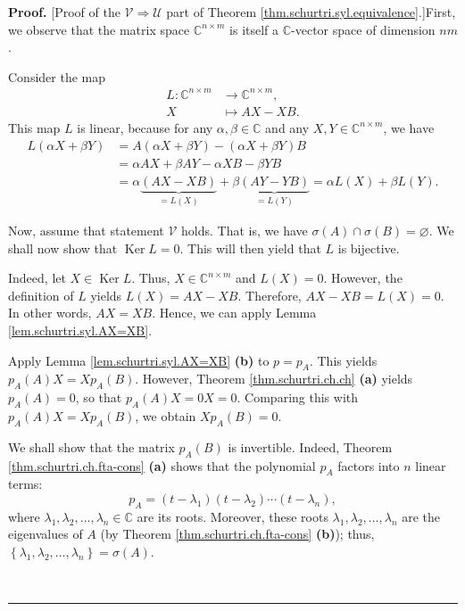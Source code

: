 \documentclass[numbers=enddot,12pt,final,onecolumn,notitlepage]{scrartcl}%
\numberwithin{exer}{subsection}
\theoremstyle{definition}
\newenvironment{proof}[1][Proof]{\noindent\textbf{#1.} }{\ \rule{0.5em}{0.5em}}
\begin{document}
\begin{proof}
[Proof of the $\mathcal{V}\Longrightarrow\mathcal{U}$ part of Theorem
\ref{thm.schurtri.syl.equivalence}.]First, we observe that the matrix space
$\mathbb{C}^{n\times m}$ is itself a $\mathbb{C}$-vector space of dimension
$nm$.

Consider the map%
\begin{align*}
L:\mathbb{C}^{n\times m} &  \rightarrow\mathbb{C}^{n\times m},\\
X &  \mapsto AX-XB.
\end{align*}
This map $L$ is linear, because for any $\alpha,\beta\in\mathbb{C}$ and any
$X,Y\in\mathbb{C}^{n\times m}$, we have%
\begin{align*}
L\left(  \alpha X+\beta Y\right)   &  =A\left(  \alpha X+\beta Y\right)
-\left(  \alpha X+\beta Y\right)  B\\
&  =\alpha AX+\beta AY-\alpha XB-\beta YB\\
&  =\alpha\underbrace{\left(  AX-XB\right)  }_{=L\left(  X\right)  }%
+\beta\underbrace{\left(  AY-YB\right)  }_{=L\left(  Y\right)  }=\alpha
L\left(  X\right)  +\beta L\left(  Y\right)  .
\end{align*}


Now, assume that statement $\mathcal{V}$ holds. That is, we have
$\sigma\left(  A\right)  \cap\sigma\left(  B\right)  =\varnothing$. We shall
now show that $\operatorname*{Ker}L=0$. This will then yield that $L$ is bijective.

Indeed, let $X\in\operatorname*{Ker}L$. Thus, $X\in\mathbb{C}^{n\times m}$ and
$L\left(  X\right)  =0$. However, the definition of $L$ yields $L\left(
X\right)  =AX-XB$. Therefore, $AX-XB=L\left(  X\right)  =0$. In other words,
$AX=XB$. Hence, we can apply Lemma \ref{lem.schurtri.syl.AX=XB}.

Apply Lemma \ref{lem.schurtri.syl.AX=XB} \textbf{(b)} to $p=p_{A}$. This
yields $p_{A}\left(  A\right)  X=Xp_{A}\left(  B\right)  $. However, Theorem
\ref{thm.schurtri.ch.ch} \textbf{(a)} yields $p_{A}\left(  A\right)  =0$, so
that $p_{A}\left(  A\right)  X=0X=0$. Comparing this with $p_{A}\left(
A\right)  X=Xp_{A}\left(  B\right)  $, we obtain $Xp_{A}\left(  B\right)  =0$.

We shall show that the matrix $p_{A}\left(  B\right)  $ is invertible. Indeed,
Theorem \ref{thm.schurtri.ch.fta-cons} \textbf{(a)} shows that the polynomial
$p_{A}$ factors into $n$ linear terms:%
\begin{equation}
p_{A}=\left(  t-\lambda_{1}\right)  \left(  t-\lambda_{2}\right)
\cdots\left(  t-\lambda_{n}\right)
,\label{pf.thm.schurtri.syl.equivalence.pA=prod}%
\end{equation}
where $\lambda_{1},\lambda_{2},\ldots,\lambda_{n}\in\mathbb{C}$ are its roots.
Moreover, these roots $\lambda_{1},\lambda_{2},\ldots,\lambda_{n}$ are the
eigenvalues of $A$ (by Theorem \ref{thm.schurtri.ch.fta-cons} \textbf{(b)});
thus, $\left\{  \lambda_{1},\lambda_{2},\ldots,\lambda_{n}\right\}
=\sigma\left(  A\right)  $.


\end{proof}
\end{document}
